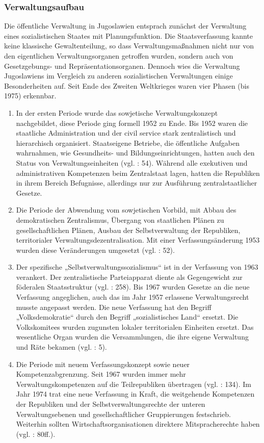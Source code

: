 \subsubsection{Verwaltungsaufbau}

Die öffentliche Verwaltung in Jugoslawien entsprach zunächst der Verwaltung eines sozialistischen Staates mit Planungsfunktion. Die Staatsverfassung kannte keine klassische Gewaltenteilung, so dass Verwaltungsmaßnahmen nicht nur von den eigentlichen Verwaltungsorganen getroffen wurden, sondern auch von Gesetzgebungs- und Repräsentationsorganen. Dennoch wies die Verwaltung Jugoslawiens im Vergleich zu anderen sozialistischen Verwaltungen einige Besonderheiten auf. Seit Ende des Zweiten Weltkrieges waren vier Phasen (bis 1975) erkennbar.
\begin{enumerate}[label={\Roman*}:,align=left,  leftmargin=*]
\item  In der ersten Periode wurde das sowjetische Verwaltungskonzept nachgebildet, diese Periode ging formell 1952 zu Ende. Bis 1952 waren die staatliche Administration und der civil service stark zentralistisch und hierarchisch organisiert. Staatseigene Betriebe, die öffentliche Aufgaben wahrnahmen, wie Gesundheits- und Bildungseinrichtungen, hatten auch den Status von Verwaltungseinheiten (vgl. \cite{sevic} : 54). Während alle exekutiven und administrativen Kompetenzen beim Zentralstaat lagen, hatten die Republiken in ihrem Bereich Befugnisse, allerdings nur zur Ausführung zentralstaatlicher Gesetze.
\item Die Periode der Abwendung vom sowjetischen Vorbild, mit Abbau des demokratischen Zentralismus, Übergang von staatlichen Plänen zu gesellschaftlichen Plänen, Ausbau der Selbstverwaltung der Republiken, territorialer Verwaltungsdezentralisation. Mit einer Verfassungsänderung 1953 wurden diese Veränderungen umgesetzt (vgl. \cite{beckm90} : 52).
\item Der spezifische „Selbstverwaltungssozialismus“ ist in der Verfassung von 1963 verankert. Der zentralistische Parteiapparat diente als Gegengewicht zur föderalen Staatsstruktur (vgl. \cite{roggemann} : 258). Bis 1967 wurden Gesetze an die neue Verfassung angeglichen, auch das im Jahr 1957 erlassene Verwaltungsrecht musste angepasst werden. Die neue Verfassung hat den Begriff „Volksdemokratie“ durch den Begriff „sozialistisches Land“ ersetzt. Die Volkskomitees wurden zugunsten lokaler territorialen Einheiten ersetzt. Das wesentliche Organ wurden die Versammlungen, die ihre eigene Verwaltung und Räte bekamen (vgl. \cite{blago69} : 5). 
\item Die Periode mit neuem Verfassungskonzept sowie neuer Kompetenzabgrenzung. Seit 1967 wurden immer mehr Verwaltungskompetenzen auf die Teilrepubliken übertragen (vgl. \cite{grot} : 134). Im Jahr 1974 trat eine neue Verfassung in Kraft, die weitgehende Kompetenzen der Republiken und der Selbstverwaltungsrechte der unteren Verwaltungsebenen und gesellschaftlicher Gruppierungen festschrieb. Weiterhin sollten Wirtschaftsorganisationen direktere Mitspracherechte haben (vgl. \cite{beckm90} : 80ff.). 
\end{enumerate}

